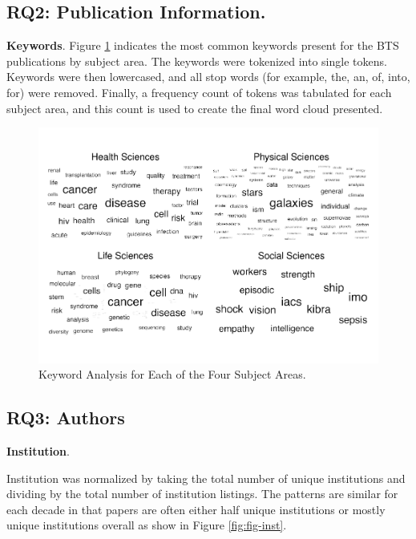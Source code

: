 \documentclass[
  man,floatsintext]{apa6}
\begin{document}
\hypertarget{rq2-publication-information.-2}{%
\subsection{RQ2: Publication Information.}\label{rq2-publication-information.-2}}

\textbf{Keywords}. Figure \ref{fig:fig-keywords} indicates the most common keywords present for the BTS publications by subject area. The keywords were tokenized into single tokens. Keywords were then lowercased, and all stop words (for example, the, an, of, into, for) were removed. Finally, a frequency count of tokens was tabulated for each subject area, and this count is used to create the final word cloud presented.

\begin{figure}
\centering
\includegraphics{manuscript_scopus_files/figure-latex/fig-keywords-1.pdf}
\caption{\label{fig:fig-keywords}Keyword Analysis for Each of the Four Subject Areas.}
\end{figure}

\hypertarget{rq3-authors}{%
\subsection{RQ3: Authors}\label{rq3-authors}}

\textbf{Institution}.

Institution was normalized by taking the total number of unique institutions and dividing by the total number of institution listings. The patterns are similar for each decade in that papers are often either half unique institutions or mostly unique institutions overall as show in Figure \ref{fig:fig-inst}.
\end{document}
